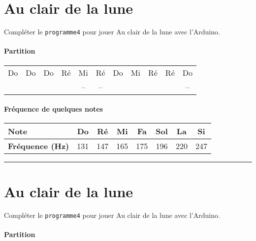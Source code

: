 \documentclass[12pt,a4paper]{article}
\begin{document}
\thispagestyle{empty}

\section*{Au clair de la lune}

Compléter le \texttt{programme4} pour jouer \og Au clair de la lune \fg{} avec l'Arduino.

\paragraph{Partition}

\begin{center}
\begin{tabular}{|ccccccccccc|}
\hline
Do 		& Do 		& Do 		& Ré 		& Mi 		& Ré 		& Do 		& Mi 		& Ré 		& Ré 		& Do \\
\cdot	& \cdot	& \cdot	& \cdot	& --			& --			& \cdot	& \cdot	& \cdot	& \cdot	& -- \\
\hline
\end{tabular}
\end{center}

\paragraph{Fréquence de quelques notes}

\begin{center}
\begin{tabular}{l|c|c|c|c|c|c|c}
\textbf{Note}						& \textbf{Do} & \textbf{Ré} & \textbf{Mi} & \textbf{Fa} & \textbf{Sol} & \textbf{La} & \textbf{Si} \\
\hline
\textbf{Fréquence (Hz)} 	& 131 & 147 & 165 & 175 & 196 & 220 & 247 \\
\end{tabular}
\end{center}

\hrule{}

\section*{Au clair de la lune}

Compléter le \texttt{programme4} pour jouer \og Au clair de la lune \fg{} avec l'Arduino.

\paragraph{Partition}
\end{document}
